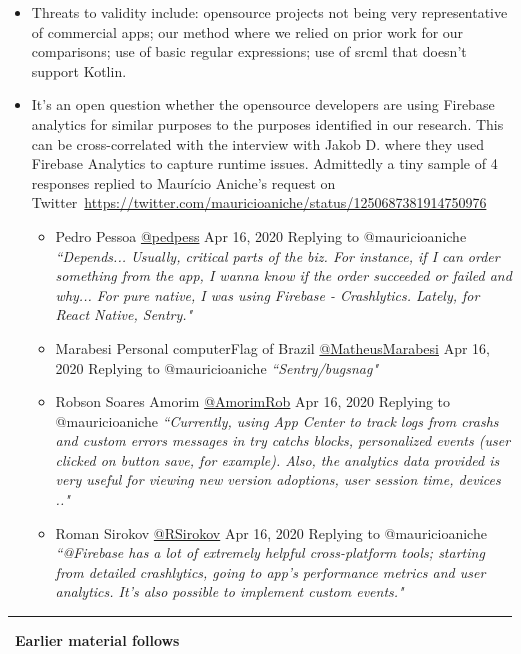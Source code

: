 \begin{itemize}
    \item Threats to validity include: opensource projects not being very representative of commercial apps; our method where we relied on prior work for our comparisons; use of basic regular expressions; use of srcml that doesn't support Kotlin.
    \item It's an open question whether the opensource developers are using Firebase analytics for similar purposes to the purposes identified in our research. This can be cross-correlated with the interview with Jakob D. where they used Firebase Analytics to capture runtime issues. Admittedly a tiny sample of 4 responses replied to Maurício Aniche's request on Twitter~\url{https://twitter.com/mauricioaniche/status/1250687381914750976} %
    \begin{itemize}
        \item Pedro Pessoa \href{https://twitter.com/pedpess}{@pedpess} Apr 16, 2020 Replying to @mauricioaniche \emph{``Depends... Usually, critical parts of the biz. For instance, if I can order something from the app, I wanna know if the order succeeded or failed and why... For pure native, I was using Firebase - Crashlytics. Lately, for React Native, Sentry."}
        \item Marabesi Personal computerFlag of Brazil \href{https://twitter.com/MatheusMarabesi}{@MatheusMarabesi} Apr 16, 2020 Replying to @mauricioaniche \emph{``Sentry/bugsnag"}
        \item Robson Soares Amorim \href{https://twitter.com/AmorimRob}{@AmorimRob} Apr 16, 2020 Replying to  @mauricioaniche \emph{``Currently, using App Center to track logs from crashs and custom errors messages in try catchs blocks, personalized events (user clicked on button save, for example). Also, the analytics data provided is very useful for viewing new version adoptions, user session time, devices .."}
        \item Roman Sirokov \href{https://twitter.com/RSirokov}{@RSirokov} Apr 16, 2020 Replying to  @mauricioaniche \emph{``@Firebase has a lot of extremely helpful cross-platform tools; starting from detailed crashlytics, going to app’s performance metrics and user analytics. It’s also possible to implement custom events."}
    \end{itemize}
\end{itemize}

\par\noindent\rule{\textwidth}{0.4pt}
~\textbf{Earlier material follows}

